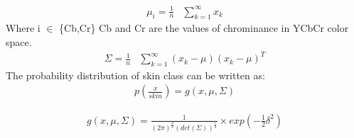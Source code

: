 \documentclass[conference]{IEEEtran}
\begin{document}
\begin{equation}
\begin{aligned}
\mu_i = \frac{1}{n} & \sum_{k=1}^\infty x_k
\end{aligned}
\end{equation}
Where i $\in$ \{Cb,Cr\}  Cb and Cr are the values of chrominance in YCbCr color space.
\begin{equation}
\begin{aligned}
\Sigma = \frac{1}{n} & \sum_{k=1}^\infty \left(x_k - \mu \right)\left(x_k - \mu \right)^T
\end{aligned}
\end{equation}
The probability distribution of skin class can be written as:
\begin{equation}
\begin{aligned}
p(\frac{x}{skin}) =  g(x,\mu,\Sigma)
\end{aligned}
\end{equation}

\begin{equation}
\begin{aligned}
g(x,\mu,\Sigma) =  \frac{1}{(2\pi)^{\frac{d}{2}}\left(det\left(\Sigma \right)\right)^\frac{1}{2}} \times exp(-\frac{1}{2}\delta^2)
\end{aligned}
\end{equation}
\end{document}
